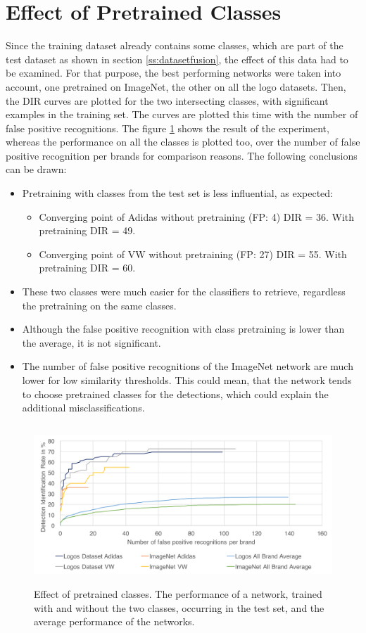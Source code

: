 \section{Effect of Pretrained Classes}
Since the training dataset already contains some classes, which are part of the test dataset as shown in section \ref{ss:datasetfusion}, the effect of this data had to be examined. For that purpose, the best performing networks were taken into account, one pretrained on ImageNet, the other on all the logo datasets. Then, the DIR curves are plotted for the two intersecting classes, with significant examples in the training set. The curves are plotted this time with the number of false positive recognitions. The figure \ref{f:commonbrandseffect} shows the result of the experiment, whereas the performance on all the classes is plotted too, over the number of false positive recognition per brands for comparison reasons. The following conclusions can be drawn:
\begin{itemize}
    \item Pretraining with classes from the test set is less influential, as expected:
    \begin{itemize}
        \item Converging point of Adidas without pretraining (FP: 4)  DIR = 36. With pretraining DIR = 49.
        \item Converging point of VW without pretraining (FP: 27)  DIR = 55. With pretraining DIR = 60.
    \end{itemize}
    \item These two classes were much easier for the classifiers to retrieve, regardless the pretraining on the same classes.
    \item Although the false positive recognition with class pretraining is lower than the average, it is not significant.
    \item The number of false positive recognitions of the ImageNet network are much lower for low similarity thresholds. This could mean, that the network tends to choose pretrained classes for the detections, which could explain the additional misclassifications.
\end{itemize}
\begin{figure}
  \centering
  \includegraphics[height=60mm]{images/mt/commonbrandseffect.png}
  \caption{Effect of pretrained classes. The performance of a network, trained with and without the two classes, occurring in the test set, and the average performance of the networks.}
  \label{f:commonbrandseffect}
\end{figure}

